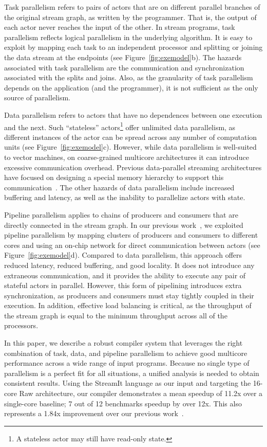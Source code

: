 Task parallelism refers to pairs of actors that are on different
parallel branches of the original stream graph, as written by the
programmer.  That is, the output of each actor never reaches the input
of the other.  In stream programs, task parallelism reflects logical
parallelism in the underlying algorithm.  It is easy to exploit by
mapping each task to an independent processor and splitting or joining
the data stream at the endpoints (see Figure~\ref{fig:exemodel}b).
The hazards associated with task parallelism are the communication and
synchronization associated with the splits and joins.  Also, as the
granularity of task parallelism depends on the application (and the
programmer), it is not sufficient as the only source of parallelism.

Data parallelism refers to actors that have no dependences between one
execution and the next.  Such ``stateless'' actors\footnote{A
stateless actor may still have read-only state.}  offer unlimited data
parallelism, as different instances of the actor can be spread across
any number of computation units (see Figure~\ref{fig:exemodel}c).
However, while data parallelism is well-suited to vector machines, on
coarse-grained multicore architectures it can introduce excessive
communication overhead.  Previous data-parallel streaming
architectures have focused on designing a special memory hierarchy to
support this communication~\cite{imagine03ieee}.  The other hazards of
data parallelism include increased buffering and latency, as well as
the inability to parallelize actors with state.

Pipeline parallelism applies to chains of producers and consumers that
are directly connected in the stream graph.  In our previous
work~\cite{streamit-asplos}, we exploited pipeline parallelism by
mapping clusters of producers and consumers to different cores and
using an on-chip network for direct communication between actors (see
Figure~\ref{fig:exemodel}d).  Compared to data parallelism, this
approach offers reduced latency, reduced buffering, and good locality.
It does not introduce any extraneous communication, and it provides
the ability to execute any pair of stateful actors in parallel.
However, this form of pipelining introduces extra synchronization, as
producers and consumers must stay tightly coupled in their execution.
In addition, effective load balancing is critical, as the throughput
of the stream graph is equal to the minimum throughput across all of
the processors.

In this paper, we describe a robust compiler system that leverages the
right combination of task, data, and pipeline parallelism to achieve
good multicore performance across a wide range of input programs.
Because no single type of parallelism is a perfect fit for all
situations, a unified analysis is needed to obtain consistent results.
Using the StreamIt language as our input and targeting the 16-core Raw
architecture, our compiler demonstrates a mean speedup of 11.2x over a
single-core baseline; 7 out of 12 benchmarks speedup by over 12x.
This also represents a 1.84x improvement over our previous
work~\cite{streamit-asplos}.

